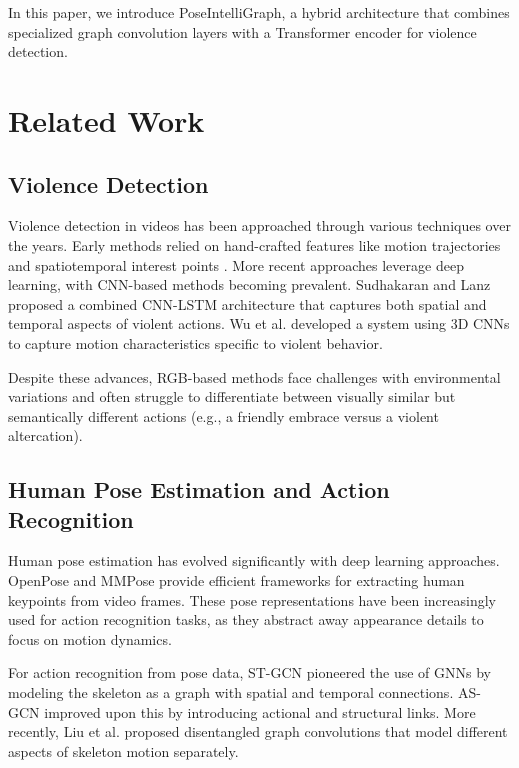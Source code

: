 \documentclass[conference]{IEEEtran}
\begin{document}
In this paper, we introduce PoseIntelliGraph, a hybrid architecture that combines specialized graph convolution layers with a Transformer encoder for violence detection.

\section{Related Work}

\subsection{Violence Detection}
Violence detection in videos has been approached through various techniques over the years. Early methods relied on hand-crafted features like motion trajectories and spatiotemporal interest points \cite{nievas2011violence}. More recent approaches leverage deep learning, with CNN-based methods becoming prevalent. Sudhakaran and Lanz \cite{sudhakaran2017learning} proposed a combined CNN-LSTM architecture that captures both spatial and temporal aspects of violent actions. Wu et al. \cite{wu2020not} developed a system using 3D CNNs to capture motion characteristics specific to violent behavior.

Despite these advances, RGB-based methods face challenges with environmental variations and often struggle to differentiate between visually similar but semantically different actions (e.g., a friendly embrace versus a violent altercation).

\subsection{Human Pose Estimation and Action Recognition}
Human pose estimation has evolved significantly with deep learning approaches. OpenPose \cite{cao2017realtime} and MMPose \cite{mmpose2020} provide efficient frameworks for extracting human keypoints from video frames. These pose representations have been increasingly used for action recognition tasks, as they abstract away appearance details to focus on motion dynamics.

For action recognition from pose data, ST-GCN \cite{yan2018spatial} pioneered the use of GNNs by modeling the skeleton as a graph with spatial and temporal connections. AS-GCN \cite{li2019actional} improved upon this by introducing actional and structural links. More recently, Liu et al. \cite{liu2020disentangling} proposed disentangled graph convolutions that model different aspects of skeleton motion separately.
\end{document}
